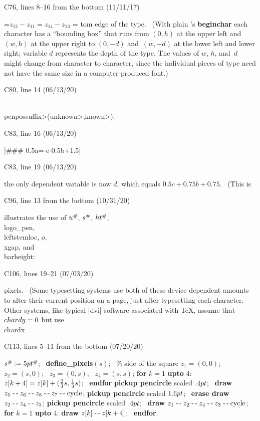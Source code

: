 \bugonpage C76, lines  8--16 from the bottom (11/11/17)

\newdimen\longesteq
{}=\hbox{\indent$z_{12}-z_{11}=z_{14}-z_{13}$\quad}
\longesteq=
\tenpoint\noindent \hangindent\longesteq {}
tom edge of the type.
\ (With plain \MF's {\bf beginchar} each
character has a ``bounding box'' that runs from $(0,h)$
at the upper left and $(w,h)$ at the upper right to $(0,-d)$ and~$(w,-d)$
at the lower left and lower right; variable $d$ represents the depth of
the type. The values of $w$, $h$, and~$d$ might change from character to
character, since the individual pieces of type need not have the same size
in a computer-produced font.)

\bugonpage C80, line 14 (06/13/20)

\tenpoint\indent
\\{penpos}\<suffix>(\<unknown>,\thinspace\<known>).

\bugonpage C83, line 16 (06/13/20)

\ninepoint\indent
|### 0.5a=-c-0.5b+1.5|

\bugonpage C83, line 19 (06/13/20)

\ninepoint\noindent
the only
dependent variable is now $d$, which equals $0.5c+0.75b+0.75$. \ (This is\cutpar

\bugonpage C96, line 13 from the bottom (10/31/20)

\tenpoint\noindent
illustrates the
use of $u\0$, $s\0$, $\\{ht}\0$, \\{logo\_pen}, \\{leftstemloc}, $o$,
\\{xgap}, and \\{barheight}:

\bugonpage C106, lines 19--21 (07/03/20)

\ninepoint\noindent
pixels. \ (Some typesetting
systems use both of these device-dependent amounts to alter their current
position on a page, just after typesetting each character. Other systems,
like typical |dvi| software associated with \TeX, assume that $\\{chardy}=0$
but use \\{chardx}\cutpar

\bugonpage C113, lines 5--11 from the bottom (07/20/20)

\def\cycle{\hbox{\rm cycle}}
\ninepoint\noindent
\begindisplay
$s\0:=5\\{pt}\0$; \ {\bf define\_pixels}$(s)$; \ \%  side of the square\cr
$z_1=(0,0)$; \ $z_2=(s,0)$; \ $z_3=(0,s)$; \ $z_4=(s,s)$;\cr
{\bf for} $k=1$ {\bf upto} 4:
 $z[k+4]=z[k]+({2\over3}s,{1\over3}s)$; \ {\bf endfor}\cr
{\bf pickup pencircle} scaled $.4\\{pt}$; \
{\bf draw} $z_5\dashto z_6\dashto z_8\dashto z_7\dashto \cycle$;\cr
{\bf pickup pencircle} scaled $1.6\\{pt}$; \
{\bf erase draw} $z_2\mathrel{\hbox{-\thinspace-\kern-.05em}} z_4\mathrel{\hbox{-\thinspace-\kern-.05em}} z_3$;\cr
{\bf pickup pencircle} scaled $.4\\{pt}$; \
{\bf draw} $z_1\dashto z_2\dashto z_4\dashto z_3\dashto \cycle$;\cr
{\bf for} $k=1$ {\bf upto} 4:
 {\bf draw} $z[k]\mathrel{\hbox{-\thinspace-\kern-.05em}} z[k+4]$; \ {\bf endfor}.\cr
\enddisplay

